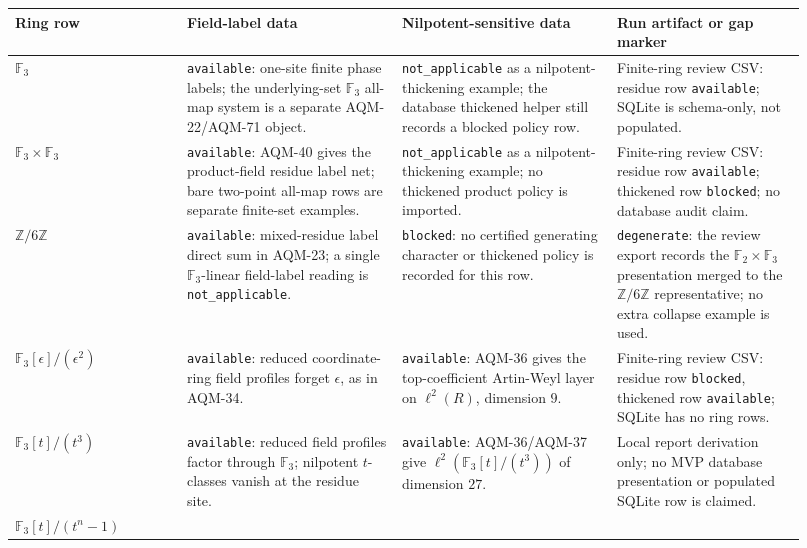 \begin{center}
\scriptsize\setlength{\tabcolsep}{3pt}
\begin{tabular}{p{0.20\linewidth}p{0.25\linewidth}p{0.25\linewidth}p{0.22\linewidth}}
\toprule
Ring row & Field-label data & Nilpotent-sensitive data & Run artifact or gap marker \\
\midrule
\(\mathbb F_3\) &
\texttt{available}: one-site finite phase labels; the underlying-set
\(\mathbb F_3\) all-map system is a separate AQM-22/AQM-71 object. &
\texttt{not\_applicable} as a nilpotent-thickening example; the database
thickened helper still records a blocked policy row. &
Finite-ring review CSV: residue row \texttt{available}; SQLite is
schema-only, not populated. \\
\addlinespace
\(\mathbb F_3\times\mathbb F_3\) &
\texttt{available}: AQM-40 gives the product-field residue label net; bare
two-point all-map rows are separate finite-set examples. &
\texttt{not\_applicable} as a nilpotent-thickening example; no thickened
product policy is imported. &
Finite-ring review CSV: residue row \texttt{available}; thickened row
\texttt{blocked}; no database audit claim. \\
\addlinespace
\(\mathbb Z/6\mathbb Z\) &
\texttt{available}: mixed-residue label direct sum in AQM-23; a single
\(\mathbb F_3\)-linear field-label reading is \texttt{not\_applicable}. &
\texttt{blocked}: no certified generating character or thickened policy is
recorded for this row. &
\texttt{degenerate}: the review export records the
\(\mathbb F_2\times\mathbb F_3\) presentation merged to the
\(\mathbb Z/6\mathbb Z\) representative; no extra collapse example is used. \\
\addlinespace
\(\mathbb F_3[\epsilon]/(\epsilon^2)\) &
\texttt{available}: reduced coordinate-ring field profiles forget
\(\epsilon\), as in AQM-34. &
\texttt{available}: AQM-36 gives the top-coefficient Artin-Weyl layer on
\(\ell^2(R)\), dimension \(9\). &
Finite-ring review CSV: residue row \texttt{blocked}, thickened row
\texttt{available}; SQLite has no ring rows. \\
\addlinespace
\(\mathbb F_3[t]/(t^3)\) &
\texttt{available}: reduced field profiles factor through
\(\mathbb F_3\); nilpotent \(t\)-classes vanish at the residue site. &
\texttt{available}: AQM-36/AQM-37 give \(\ell^2(\mathbb F_3[t]/(t^3))\) of
dimension \(27\). &
Local report derivation only; no MVP database presentation or populated
SQLite row is claimed. \\
\addlinespace
\(\mathbb F_3[t]/(t^n-1)\) &

\end{tabular}
\end{center}

